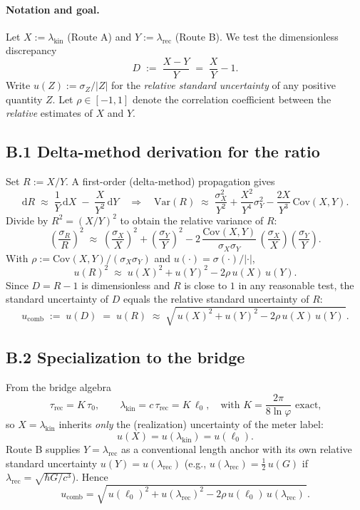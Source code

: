 \documentclass[11pt]{article}
\begin{document}
\paragraph{Notation and goal.}
Let \(X:=\lambda_{\mathrm{kin}}\) (Route A) and \(Y:=\lambda_{\mathrm{rec}}\) (Route B). We test the dimensionless discrepancy
\[
D\;:=\;\frac{X-Y}{Y}\;=\;\frac{X}{Y}-1.
\]
Write \(u(Z):=\sigma_Z/|Z|\) for the \emph{relative standard uncertainty} of any positive quantity \(Z\). Let \(\rho\in[-1,1]\) denote the correlation coefficient between the \emph{relative} estimates of \(X\) and \(Y\).

\subsection*{B.1 Delta-method derivation for the ratio}
Set \(R:=X/Y\). A first-order (delta-method) propagation gives
\[
\mathrm{d}R \;\approx\; \frac{1}{Y}\,\mathrm{d}X \;-\; \frac{X}{Y^2}\,\mathrm{d}Y
\quad\Rightarrow\quad
\mathrm{Var}(R) \;\approx\; \frac{\sigma_X^2}{Y^2}+\frac{X^2}{Y^4}\sigma_Y^2-\frac{2X}{Y^3}\,\mathrm{Cov}(X,Y).
\]
Divide by \(R^2=(X/Y)^2\) to obtain the relative variance of \(R\):
\[
\left(\frac{\sigma_R}{R}\right)^2
\;\approx\;
\left(\frac{\sigma_X}{X}\right)^2
+
\left(\frac{\sigma_Y}{Y}\right)^2
-
2\,\frac{\mathrm{Cov}(X,Y)}{\sigma_X\sigma_Y}\,
\left(\frac{\sigma_X}{X}\right)\!\left(\frac{\sigma_Y}{Y}\right).
\]
With \(\rho:=\mathrm{Cov}(X,Y)/(\sigma_X\sigma_Y)\) and \(u(\cdot)=\sigma(\cdot)/|\cdot|\),
\[
u(R)^2 \;\approx\; u(X)^2 + u(Y)^2 - 2\rho\,u(X)\,u(Y).
\]
Since \(D=R-1\) is dimensionless and \(R\) is close to \(1\) in any reasonable test, the standard uncertainty of \(D\) equals the relative standard uncertainty of \(R\):
\[
u_{\mathrm{comb}} \;:=\; u(D) \;=\; u(R)
\;\approx\;
\sqrt{\,u(X)^2 + u(Y)^2 - 2\rho\,u(X)\,u(Y)\,}.
\]

\subsection*{B.2 Specialization to the bridge}
From the bridge algebra
\[
\tau_{\mathrm{rec}}=K\,\tau_0,\qquad \lambda_{\mathrm{kin}}=c\,\tau_{\mathrm{rec}}=K\,\ell_0,
\quad\text{with }K=\frac{2\pi}{8\ln\varphi}\text{ exact,}
\]
so \(X=\lambda_{\mathrm{kin}}\) inherits \emph{only} the (realization) uncertainty of the meter label:
\[
u(X)=u(\lambda_{\mathrm{kin}})=u(\ell_0).
\]
Route B supplies \(Y=\lambda_{\mathrm{rec}}\) as a conventional length anchor with its own relative standard uncertainty \(u(Y)=u(\lambda_{\mathrm{rec}})\) (e.g., \(u(\lambda_{\mathrm{rec}})=\tfrac12\,u(G)\) if \(\lambda_{\mathrm{rec}}=\sqrt{\hbar G / c^3}\)).
Hence
\[
u_{\mathrm{comb}}
=
\sqrt{\,u(\ell_0)^2 + u(\lambda_{\mathrm{rec}})^2 - 2\rho\,u(\ell_0)\,u(\lambda_{\mathrm{rec}})\,}.
\]
\end{document}
